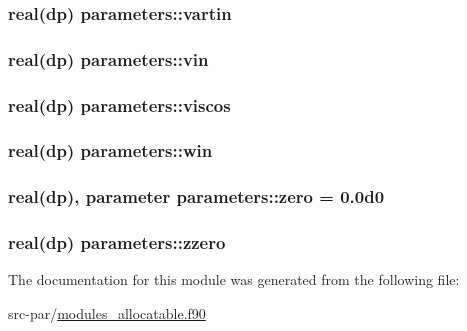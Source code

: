 \hypertarget{classparameters_a76a598f44d6528b32af1ddbd94d3dae3}{
\subsubsection[{vartin}]{\setlength{\rightskip}{0pt plus 5cm}real(dp) parameters\-::vartin}}\label{classparameters_a76a598f44d6528b32af1ddbd94d3dae3}
\hypertarget{classparameters_a80d24f7ebf459082bd5781e73821782e}{
\subsubsection[{vin}]{\setlength{\rightskip}{0pt plus 5cm}real(dp) parameters\-::vin}}\label{classparameters_a80d24f7ebf459082bd5781e73821782e}
\hypertarget{classparameters_acfe414c2740060c74afa99599bdb9680}{
\subsubsection[{viscos}]{\setlength{\rightskip}{0pt plus 5cm}real(dp) parameters\-::viscos}}\label{classparameters_acfe414c2740060c74afa99599bdb9680}
\hypertarget{classparameters_a037dd7329cf60733d4c01e9cb05b423b}{
\subsubsection[{win}]{\setlength{\rightskip}{0pt plus 5cm}real(dp) parameters\-::win}}\label{classparameters_a037dd7329cf60733d4c01e9cb05b423b}
\hypertarget{classparameters_a623b51a825739232a4efb904450ffe78}{
\subsubsection[{zero}]{\setlength{\rightskip}{0pt plus 5cm}real(dp), parameter parameters\-::zero = 0.\-0d0}}\label{classparameters_a623b51a825739232a4efb904450ffe78}
\hypertarget{classparameters_a3a0c2dcba4cf4280ac0122ba50270002}{
\subsubsection[{zzero}]{\setlength{\rightskip}{0pt plus 5cm}real(dp) parameters\-::zzero}}\label{classparameters_a3a0c2dcba4cf4280ac0122ba50270002}


The documentation for this module was generated from the following file\-:\begin{DoxyCompactItemize}
\item 
src-\/par/\hyperlink{modules__allocatable_8f90}{modules\-\_\-allocatable.\-f90}\end{DoxyCompactItemize}
